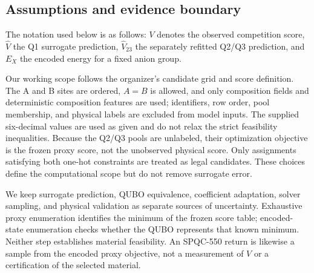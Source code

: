 \subsection{Assumptions and evidence boundary}

The notation used below is as follows: $V$ denotes the observed
competition score, $\widehat V$ the Q1 surrogate prediction,
$\widehat V_{23}$ the separately refitted Q2/Q3 prediction, and $E_X$ the
encoded energy for a fixed anion group.

Our working scope follows the organizer's candidate grid and score
definition.  The A and B sites are ordered, $A=B$ is allowed, and only
composition fields and deterministic composition features are used;
identifiers, row order, pool membership, and physical labels are excluded
from model inputs.  The supplied six-decimal values are used as given and
do not relax the strict feasibility inequalities.  Because the Q2/Q3
pools are unlabeled, their optimization objective is the frozen proxy
score, not the unobserved physical score.  Only assignments satisfying
both one-hot constraints are treated as legal candidates.  These choices
define the computational scope but do not remove surrogate error.

We keep surrogate prediction, QUBO equivalence, coefficient adaptation,
solver sampling, and physical validation as separate sources of
uncertainty.  Exhaustive proxy enumeration identifies the minimum of the
frozen score table; encoded-state enumeration checks whether the QUBO
represents that known minimum.  Neither step establishes material
feasibility.  An SPQC-550 return is likewise a sample from the encoded
proxy objective, not a measurement of $V$ or a certification of the
selected material.
